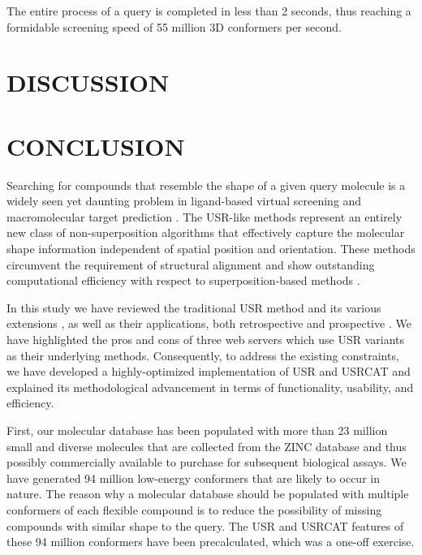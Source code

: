 \documentclass[a4,center,fleqn]{NAR}
\begin{document}
The entire process of a query is completed in less than 2 seconds, thus reaching a formidable screening speed of 55 million 3D conformers per second.

\section{DISCUSSION}



\section{CONCLUSION}

Searching for compounds that resemble the shape of a given query molecule is a widely seen yet daunting problem in ligand-based virtual screening \cite{1332,1380,1281,1504,1502,1615} and macromolecular target prediction \cite{1407,1408,1402}. The USR-like methods \cite{1379,1338,1331} represent an entirely new class of non-superposition algorithms that effectively capture the molecular shape information independent of spatial position and orientation. These methods circumvent the requirement of structural alignment and show outstanding computational efficiency with respect to superposition-based methods \cite{1440,887,1439}.

In this study we have reviewed the traditional USR method \cite{1379} and its various extensions \cite{1333,1436,1437,1334,1335,1337,1338,1331,1407,1408,1675}, as well as their applications, both retrospective \cite{1332,1331} and prospective \cite{1505,1380,1281,1504,1502,1615}. We have highlighted the pros and cons of three web servers \cite{1436,1437,1408} which use USR variants as their underlying methods. Consequently, to address the existing constraints, we have developed a highly-optimized implementation of USR \cite{1379} and USRCAT \cite{1331} and explained its methodological advancement in terms of functionality, usability, and efficiency.

First, our molecular database has been populated with more than 23 million small and diverse molecules that are collected from the ZINC database \cite{532,1178} and thus possibly commercially available to purchase for subsequent biological assays. We have generated 94 million low-energy conformers that are likely to occur in nature. The reason why a molecular database should be populated with multiple conformers of each flexible compound is to reduce the possibility of missing compounds with similar shape to the query. The USR and USRCAT features of these 94 million conformers have been precalculated, which was a one-off exercise.
\end{document}
